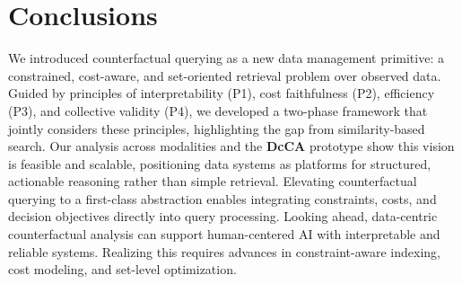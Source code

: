 \section{Conclusions}\label{sec:con}
We introduced counterfactual querying as a new data management primitive: a constrained, cost-aware, and set-oriented retrieval problem over observed data. Guided by principles of interpretability (P1), cost faithfulness (P2), efficiency (P3), and collective validity (P4), we developed a two-phase framework that jointly considers these principles, highlighting the gap from similarity-based search. Our analysis across modalities and the \textbf{DcCA} prototype show this vision is feasible and scalable, positioning data systems as platforms for structured, actionable reasoning rather than simple retrieval. Elevating counterfactual querying to a first-class abstraction enables integrating constraints, costs, and decision objectives directly into query processing. Looking ahead, data-centric counterfactual analysis can support human-centered AI with interpretable and reliable systems. Realizing this requires advances in constraint-aware indexing, cost modeling, and set-level optimization.